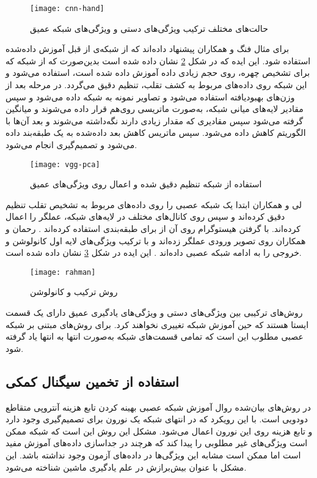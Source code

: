 \begin{figure}[hb]
	\centerline{\texttt{[image: cnn-hand]}}
	\caption{حالت‌های مختلف ترکیب ویژگی‌های دستی و ویژگی‌های شبکه عمیق \cite{yu2021deep}}
	\label{fig:cnn-hand}
\end{figure}

برای مثال فنگ و همکاران 
\cite{li2016original} 
پیشنهاد داده‌اند که از شبکه‌ی از قبل آموزش داده‌شده استفاده شود. 
این ایده که در شکل 
\ref{fig:vgg-pca}
 نشان داده شده است
بدین‌صورت که از شبکه
  \cite{parkhi2015deep}
 که برای تشخیص چهره، روی حجم زیادی داده آموزش داده شده است، استفاده می‌شود و این شبکه روی داده‌های مربوط به کشف تقلب، تنظیم دقیق
  می‌گردد. در مرحله بعد از وزن‌های بهبود‌یافته استفاده می‌شود و تصاویر نمونه به شبکه داده می‌شود و سپس مقادیر لایه‌های میانی شبکه، به‌صورت ماتریسی روی‌هم قرار داده می‌شوند و میانگین گرفته می‌شود سپس مقادیری که مقدار زیادی دارند نگه‌داشته می‌شوند و بعد آن‌ها با الگوریتم  کاهش داده می‌شود. سپس ماتریس کاهش بعد داده‌شده به یک طبقه‌بند  داده می‌شود و تصمیم‌گیری انجام می‌شود. 
\begin{figure}[h]
	\centerline{\texttt{[image: vgg-pca]}}
	\caption{استفاده از شبکه تنظیم دقیق شده و اعمال
		روی ویژگی‌های عمیق
		\cite{li2016original}}
	\label{fig:vgg-pca}
\end{figure}

لی و همکاران ابتدا یک شبکه عصبی
را روی داده‌های مربوط به تشخیص تقلب تنظیم دقیق کرده‌اند و سپس روی کانال‌های مختلف در لایه‌های شبکه، عملگر  را اعمال کرده‌اند. با گرفتن هیستوگرام روی آن از  برای طبقه‌بندی استفاده کرده‌اند
\cite{li2019face}.
رحمان و همکاران روی تصویر ورودی عملگر  زده‌اند و با ترکیب ویژگی‌های لایه اول کانولوشن و خروجی  را به ادامه شبکه عصبی داده‌اند
\cite{rehman2020enhancing}. 
 این ایده در شکل
\ref{fig:rahman}
نشان داده شده است.
\begin{figure}[!h]
	\centerline{\texttt{[image: rahman]}}
	\caption{روش ترکیب  و کانولوشن \cite{rehman2020enhancing}}
	\label{fig:rahman}
\end{figure}

روش‌های ترکیبی بین ویژگی‌های دستی و ویژگی‌های یادگیری عمیق دارای یک قسمت ایستا هستند که حین آموزش شبکه تغییری نخواهند کرد. برای روش‌های مبتنی بر شبکه عصبی مطلوب این است که تمامی قسمت‌های شبکه به‌صورت انتها به انتها یاد گرفته شود.


\subsection{استفاده از تخمین سیگنال کمکی}
در روش‌های بیان‌شده روال آموزش شبکه عصبی بهینه کردن تابع هزینه آنتروپی متقاطع دودویی
 است. با این رویکرد که در انتهای شبکه یک نورون برای تصمیم‌گیری وجود دارد و تابع هزینه روی این نورون اعمال می‌شود. مشکل این روش این است که شبکه ممکن است ویژگی‌های غیر مطلوبی را پیدا کند که هر‌چند در جداسازی داده‌های آموزش مفید است اما ممکن است مشابه این ویژگی‌ها در داده‌های آزمون وجود نداشته باشد. این مشکل با عنوان بیش‌برازش
در علم یادگیری ماشین شناخته می‌شود.

